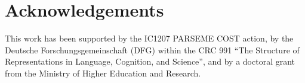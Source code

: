 \documentclass[output=paper]{langsci/langscibook}
\begin{document}
\section*{Acknowledgements}
This work has been supported by the IC1207 PARSEME COST action, by the Deutsche Forschungsgemeinschaft
(DFG) within the CRC 991 ``The Structure of Representations in Language, Cognition, and Science'', and by a doctoral grant from the  Ministry of Higher Education and Research.

{\sloppy\printbibliography[heading=subbibliography,notkeyword=this]}
\end{document}
